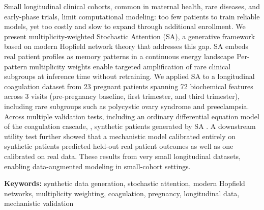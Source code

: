 Small longitudinal clinical cohorts, common in maternal health, rare diseases, and
early-phase trials, limit computational modeling: too few
patients to train reliable models, yet too costly and slow to expand through
additional enrollment. We present multiplicity-weighted Stochastic Attention (SA), a
generative framework based on modern Hopfield network theory that addresses this
gap. SA embeds real patient profiles as memory patterns in a continuous energy
landscape  Per-pattern multiplicity weights enable targeted amplification of rare
clinical subgroups at inference time without retraining. We applied SA to a
longitudinal coagulation dataset from 23 pregnant patients spanning 72 biochemical
features across 3 visits (pre-pregnancy baseline, first trimester, and third
trimester), including rare subgroups such as polycystic ovary syndrome and
preeclampsia. Across multiple validation tests, including an ordinary differential
equation model of the coagulation cascade, , synthetic patients generated by SA
. A downstream utility test further showed
that a mechanistic model calibrated entirely on synthetic patients predicted held-out
real patient outcomes as well as one calibrated on real data. These results
from very small longitudinal datasets, enabling data-augmented modeling in small-cohort settings.

\medskip
\noindent\textbf{Keywords:} synthetic data generation, stochastic attention, modern Hopfield networks,
multiplicity weighting, coagulation, pregnancy, longitudinal data, mechanistic validation
